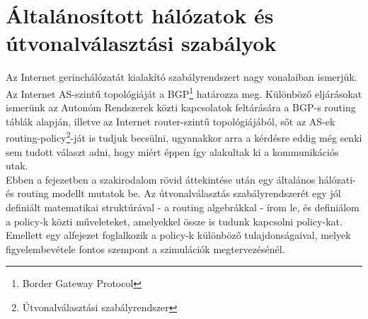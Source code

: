 



\newtheorem{definition}{Definíció}
\newtheorem{conjecture}{Sejtés}
\newtheorem{lemma}{Lemma}
\newtheorem{theorem}{Tétel}
\newtheorem{note}{Megjegyzés}




\chapter{Általánosított hálózatok és útvonalválasztási szabályok}\label{modell}

Az Internet gerinchálózatát kialakító szabályrendszert nagy vonalaiban ismerjük. Az Internet AS-szintű topológiáját a BGP\footnote{Border Gateway Protocol} határozza meg. Különböző eljárásokat ismerünk az Autonóm Rendszerek közti kapcsolatok feltárására a BGP-s routing táblák alapján, illetve az Internet router-szintű topológiájából, sőt az AS-ek routing-policy\footnote{Útvonalválasztási szabályrendszer}-ját is tudjuk becsülni, ugyanakkor arra a kérdésre eddig még senki sem tudott választ adni, hogy miért éppen így alakultak ki a kommunikációs utak.\\

Ebben a fejezetben a szakirodalom rövid áttekintése után egy általános hálózati- és routing modellt mutatok be. Az útvonalválasztás szabályrendszerét egy jól definiált matematikai struktúrával - a routing algebrákkal - írom le, és definiálom a policy-k közti műveleteket, amelyekkel össze is tudunk kapcsolni policy-kat. Emellett egy alfejezet foglalkozik a policy-k különböző tulajdonságaival, melyek figyelembevétele fontos szempont a szimulációk megtervezésénél.

